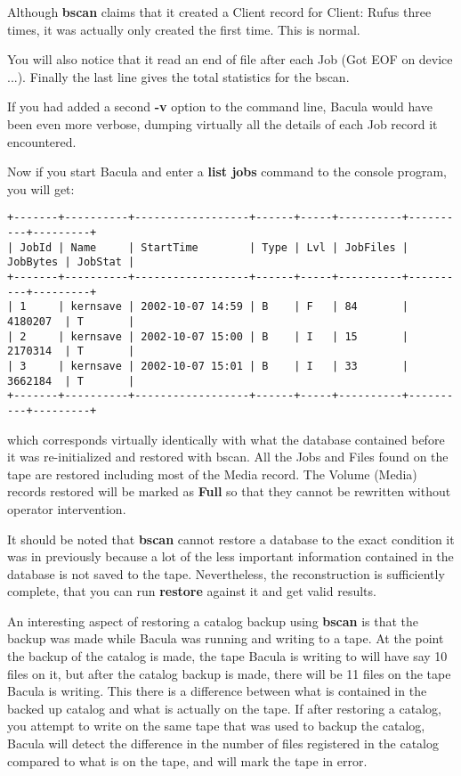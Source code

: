 Although {\bf bscan} claims that it created a Client record for Client: Rufus
three times, it was actually only created the first time. This is normal.

You will also notice that it read an end of file after each Job (Got EOF on
device ...). Finally the last line gives the total statistics for the bscan.

If you had added a second {\bf -v} option to the command line, Bacula would
have been even more verbose, dumping virtually all the details of each Job
record it encountered.

Now if you start Bacula and enter a {\bf list jobs} command to the console
program, you will get:

\footnotesize
\begin{verbatim}
+-------+----------+------------------+------+-----+----------+----------+---------+
| JobId | Name     | StartTime        | Type | Lvl | JobFiles | JobBytes | JobStat |
+-------+----------+------------------+------+-----+----------+----------+---------+
| 1     | kernsave | 2002-10-07 14:59 | B    | F   | 84       | 4180207  | T       |
| 2     | kernsave | 2002-10-07 15:00 | B    | I   | 15       | 2170314  | T       |
| 3     | kernsave | 2002-10-07 15:01 | B    | I   | 33       | 3662184  | T       |
+-------+----------+------------------+------+-----+----------+----------+---------+
\end{verbatim}
\normalsize

which corresponds virtually identically with what the database contained
before it was re-initialized and restored with bscan. All the Jobs and Files
found on the tape are restored including most of the Media record. The Volume
(Media) records restored will be marked as {\bf Full} so that they cannot be
rewritten without operator intervention.

It should be noted that {\bf bscan} cannot restore a database to the exact
condition it was in previously because a lot of the less important information
contained in the database is not saved to the tape. Nevertheless, the
reconstruction is sufficiently complete, that you can run {\bf restore}
against it and get valid results.

An interesting aspect of restoring a catalog backup using {\bf bscan} is
that the backup was made while Bacula was running and writing to a tape. At
the point the backup of the catalog is made, the tape Bacula is writing to
will have say 10 files on it, but after the catalog backup is made, there
will be 11 files on the tape Bacula is writing.  This there is a difference
between what is contained in the backed up catalog and what is actually on
the tape.  If after restoring a catalog, you attempt to write on the same
tape that was used to backup the catalog, Bacula will detect the difference
in the number of files registered in the catalog compared to what is on the
tape, and will mark the tape in error.

